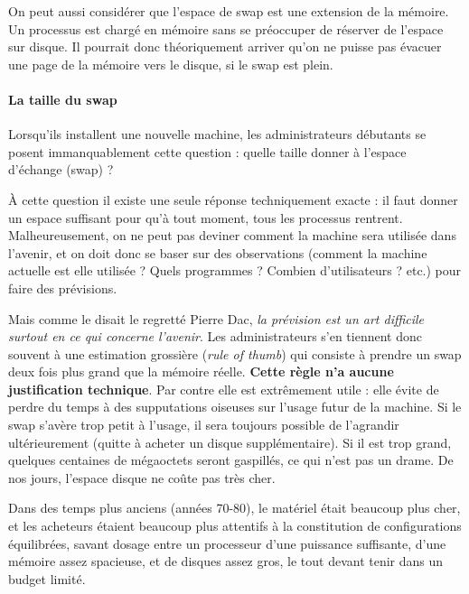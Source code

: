 \begin{multicols}{2}
On peut aussi considérer que l'espace de swap est une extension de la
mémoire.  Un processus est chargé en mémoire sans se préoccuper de
réserver de l'espace sur disque. Il pourrait donc théoriquement
arriver qu'on ne puisse pas évacuer une page de la mémoire vers le
disque, si le swap est plein.

\paragraph{La taille du swap}

Lorsqu'ils installent une nouvelle machine, les administrateurs
débutants se posent immanquablement cette question : quelle taille
donner à l'espace d'échange (swap) ?

À cette question il existe une seule réponse techniquement exacte : il
faut donner un espace suffisant pour qu'à tout moment, tous les processus
rentrent.  Malheureusement, on ne peut pas deviner comment la machine
sera utilisée dans l'avenir, et on doit donc se baser sur des observations
(comment la machine actuelle est elle utilisée ? Quels programmes ?
Combien d'utilisateurs ? etc.) pour faire des prévisions.

Mais comme le disait le regretté Pierre Dac, {\em la prévision est un 
art difficile surtout en ce qui concerne l'avenir}. Les administrateurs
s'en tiennent donc souvent à une estimation grossière ({\em rule of thumb})
qui consiste à prendre un swap deux fois plus grand que la mémoire réelle.
{\bf Cette règle n'a aucune justification technique}. Par contre elle est
extrêmement utile : elle évite de perdre du temps à des supputations oiseuses
sur l'usage futur de la machine. Si le swap s'avère trop petit à l'usage, il
sera toujours possible de l'agrandir ultérieurement (quitte à acheter
un disque supplémentaire). Si il est trop grand,
quelques centaines de mégaoctets seront gaspillés, ce qui n'est pas un 
drame. De nos jours, l'espace disque ne coûte pas très cher.

Dans des temps plus anciens (années 70-80), le matériel était beaucoup
plus cher, et les acheteurs étaient beaucoup plus attentifs à la
constitution de configurations équilibrées, savant dosage entre un
processeur d'une puissance suffisante, d'une mémoire assez spacieuse,
et de disques assez gros, le tout devant tenir dans un budget limité.


\end{multicols}
